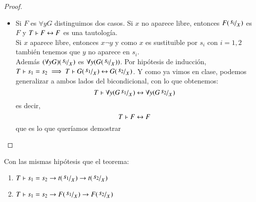 \begin{proof}
\begin{enumerate}[(a)]
\begin{itemize}
                \item Si $F$ es $\forall y G$ distinguimos dos casos. Si $x$ no aparece libre, entonces $F(\quox{s_i})$ es $F$ y $T \vdash F \leftrightarrow F$ es una tautología.\\
                      Si $x$ aparece libre, entonces $x \neg y$ y como $x$ es sustituible por $s_i$ con $i = 1,2$ también tenemos que $y$ no aparece en $s_i$.\\
                      Además $(\forall y G)(\quox{s_i})$ es $\forall y (G(\quox{s_i}))$. Por hipótesis de inducción, $T \vdash s_1 = s_2 \implies T \vdash G(\quox{s_1}) \bicond G(\quox{s_2})$. Y como ya vimos en clase, podemos generalizar a ambos lados del bicondicional, con lo que obtenemos:
                      $$
                            T \vdash \forall y (G\quox{s_1}) \bicond \forall y (G\quox{s_2})
                      $$
                      es decir,
                      $$
                            T \vdash F \leftrightarrow F
                      $$
                      que es lo que queríamos demostrar
            \end{itemize}
    \end{enumerate}
\end{proof}

\begin{cor}
    Con las mismas hipótesis que el teorema:
        \begin{enumerate}[(a')]
            \item $T \vdash s_1 = s_2 \then t(\quox{s_1}) \then t(\quox{s_2})$
            \item $T \vdash s_1 = s_2 \then F(\quox{s_1}) \then F(\quox{s_2})$
        \end{enumerate}
\end{cor}


